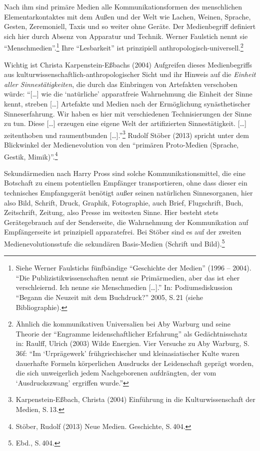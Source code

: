 \documentclass[a4paper,
fontsize=11pt,
oneside,
numbers=noperiodatend,
parskip=half-,
bibliography=totoc,
final
]{scrartcl}
\begin{document}
Nach ihm sind primäre Medien alle Kommunikationsformen des menschlichen
Elementarkontaktes mit dem Außen und der Welt wie Lachen, Weinen,
Sprache, Gesten, Zeremoniell, Taxis und so weiter ohne Geräte. Der
Medienbegriff definiert sich hier durch Absenz von Apparatur und
Technik. Werner Faulstich nennt sie \enquote{Menschmedien}.\footnote{Siehe
  Werner Faulstichs fünfbändige \enquote{Geschichte der Medien} (1996 --
  2004). \enquote{Die Publizistikwissenschaften nennt sie Primärmedien,
  aber das ist eher verschleiernd. Ich nenne sie Menschmedien
  {[}\ldots{}{]}.} In: Podiumsdiskussion \enquote{Begann die Neuzeit mit
  dem Buchdruck?} 2005, S.\,21 (siehe Bibliographie).} Ihre
\enquote{Lesbarkeit} ist prinzipiell
anthropologisch-universell.\footnote{Ähnlich die kommunikativen
  Universalien bei Aby Warburg und seine Theorie der \enquote{Engramme
  leidenschaftlicher Erfahrung} als Gedächtnisschatz in: Raulff, Ulrich
  (2003) Wilde Energien. Vier Versuche zu Aby Warburg, S.\,36f:
  \enquote{Im \enquote{Urprägewerk} frühgriechischer und
  kleinasiatischer Kulte waren dauerhafte Formeln körperlichen Ausdrucks
  der Leidenschaft geprägt worden, die sich unweigerlich jedem
  Nachgeborenen aufdrängten, der vom \enquote{Ausdruckszwang} ergriffen
  wurde.}}

Wichtig ist Christa Karpenstein-Eßbachs (2004) Aufgreifen dieses
Medienbegriffs aus kultur\-wis\-senschaftlich-anthropologischer Sicht und
ihr Hinweis auf die \emph{Einheit aller Sinnestätigkeiten}, die durch
das Einbringen von Artefakten verschoben würde: \enquote{{[}\ldots{}{]}
wie die \enquote{natürliche} apparatfreie Wahrnehmung die Einheit der
Sinne kennt, streben {[}\ldots{}{]} Artefakte und Medien nach der
Ermöglichung synästhetischer Sinneserfahrung. Wir haben es hier mit
verschiedenen Technisierungen der Sinne zu tun. Diese {[}\ldots{}{]}
erzeugen eine eigene Welt der artifizierten Sinnestätigkeit.
{[}\ldots{}{]} zeitenthoben und raumentbunden {[}\ldots{}{]}.}\footnote{Karpenstein-Eßbach,
  Christa (2004) Einführung in die Kulturwissenschaft der Medien, S.\,13.}
Rudolf Stöber (2013) spricht unter dem Blickwinkel der Medienevolution
von den \enquote{primären Proto-Medien (Sprache, Gestik,
Mimik)}.\footnote{Stöber, Rudolf (2013) Neue Medien. Geschichte, S.\,404.}

Sekundärmedien nach Harry Pross sind solche Kommunikationsmittel, die
eine Botschaft zu einem potentiellen Empfänger transportieren, ohne dass
dieser ein technisches Empfangsgerät benötigt außer seinen natürlichen
Sinnesorganen, hier also Bild, Schrift, Druck, Graphik, Fotographie,
auch Brief, Flugschrift, Buch, Zeitschrift, Zeitung, also Presse im
weitesten Sinne. Hier besteht stets Gerätegebrauch auf der Senderseite,
die Wahrnehmung der Kommunikation auf Empfängerseite ist prinzipiell
apparatefrei. Bei Stöber sind es auf der zweiten Medienevolutionsstufe
die sekundären Basis-Medien (Schrift und Bild).\footnote{Ebd., S.\,404.}
\end{document}
